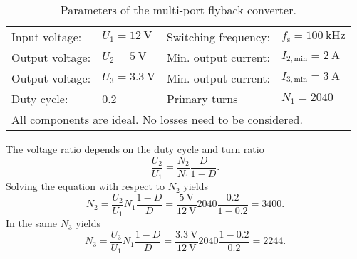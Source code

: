 

\begin{table}[ht]
    \centering  %
    \begin{tabular}{llll}
        \toprule
        Input voltage: &  $U_{\mathrm{1}} = \SI{12}{\volt}$ & Switching frequency: & $f_\mathrm{s} = \SI{100}{\kilo\hertz}$\\ 
        Output voltage: & $U_{\mathrm{2}} = \SI{5}{\volt}$  & Min. output current: & $I_{\mathrm{2,min}} = \SI{2}{\ampere}$ \\ 
        Output voltage: &  $U_{\mathrm{3}} = \SI{3.3}{\volt}$ & Min. output current: & $I_{\mathrm{3,min}} = \SI{3}{\ampere}$ \\ 
        Duty cycle: & 0.2 & Primary turns & $N_{\mathrm{1}} = 2040$\\ 
        \midrule
        \multicolumn{4}{l}{\quad All components are ideal. No losses need to be considered.}  \\ 
        \bottomrule
    \end{tabular}
    \caption{Parameters of the multi-port flyback converter.}  %
    \label{table:MultiportFlybackConverter}
\end{table}


 
\begin{solutionblock}
  The voltage ratio depends on the duty cycle and turn ratio
  \begin{equation*}
      \frac{U_\mathrm{2}}{U_\mathrm{1}}=\frac{N_\mathrm{2}}{N_\mathrm{1}} \frac{D}{1-D}.
  \end{equation*}
  Solving the equation with respect to $N_\mathrm{2}$ yields
  \begin{equation*}
      N_\mathrm{2}=\frac{U_\mathrm{2}}{U_\mathrm{1}} N_\mathrm{1} \frac{1-D}{D} = \frac{\SI{5}{\volt}}{\SI{12}{\volt}} 2040 \frac{0.2}{1-0.2}=3400.
  \end{equation*}
  In the same $N_\mathrm{3}$ yields
  \begin{equation*}
      N_\mathrm{3}=\frac{U_\mathrm{3}}{U_\mathrm{1}} N_\mathrm{1} \frac{1-D}{D} = \frac{\SI{3.3}{\volt}}{\SI{12}{\volt}} 2040 \frac{1-0.2}{0.2}=2244.
  \end{equation*}
\end{solutionblock}

